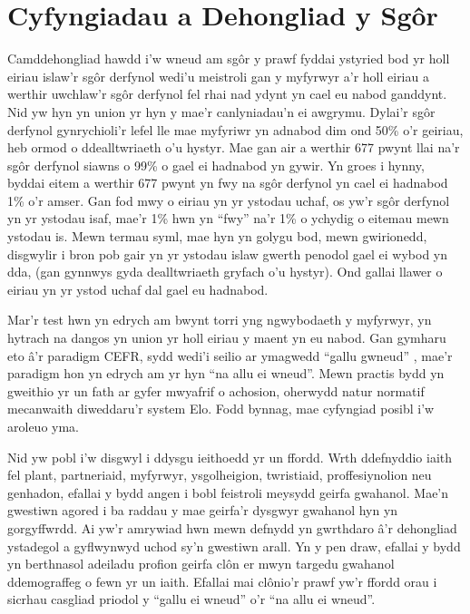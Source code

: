 \section{Cyfyngiadau a Dehongliad y Sgôr}
Camddehongliad hawdd i'w wneud am sgôr y prawf fyddai ystyried bod yr holl eiriau islaw'r sgôr derfynol wedi'u meistroli gan y myfyrwyr a'r holl eiriau a werthir uwchlaw'r sgôr derfynol fel rhai nad ydynt yn cael eu nabod ganddynt. Nid yw hyn yn union yr hyn y mae'r canlyniadau'n ei awgrymu. Dylai'r sgôr derfynol gynrychioli'r lefel lle mae myfyriwr yn adnabod dim ond 50\% o'r geiriau, heb ormod o ddealltwriaeth o'u hystyr. Mae gan air a werthir 677 pwynt llai na'r sgôr derfynol siawns o 99\% o gael ei hadnabod yn gywir. Yn groes i hynny, byddai eitem a werthir 677 pwynt yn fwy na sgôr derfynol yn cael ei hadnabod 1\% o'r amser. Gan fod mwy o eiriau yn yr ystodau uchaf, os yw'r sgôr derfynol yn yr ystodau isaf, mae'r 1\% hwn yn ``fwy'' na'r 1\% o ychydig o eitemau mewn ystodau is. Mewn termau syml, mae hyn yn golygu bod, mewn gwirionedd, disgwylir i bron pob gair yn yr ystodau islaw gwerth penodol gael ei wybod yn dda, (gan gynnwys gyda dealltwriaeth gryfach o'u hystyr). Ond gallai llawer o eiriau yn yr ystod uchaf dal gael eu hadnabod.

Mar'r test hwn yn edrych am bwynt torri yng ngwybodaeth y myfyrwyr, yn hytrach na dangos yn union yr holl eiriau y maent yn eu nabod. Gan gymharu eto â'r paradigm CEFR, sydd wedi'i seilio ar ymagwedd ``gallu gwneud'' \parencite{europe_common_2020}, mae'r paradigm hon yn edrych am yr hyn ``na allu ei wneud''. Mewn practis bydd yn gweithio yr un fath ar gyfer mwyafrif o achosion, oherwydd natur normatif mecanwaith diweddaru'r system Elo. Fodd bynnag, mae cyfyngiad posibl i'w aroleuo yma.

Nid yw pobl i'w disgwyl i ddysgu ieithoedd yr un ffordd. Wrth ddefnyddio iaith fel plant, partneriaid, myfyrwyr, ysgolheigion, twristiaid, proffesiynolion neu genhadon, efallai y bydd angen i bobl feistroli meysydd geirfa gwahanol. Mae'n gwestiwn agored i ba raddau y mae geirfa'r dysgwyr gwahanol hyn yn gorgyffwrdd. Ai yw'r amrywiad hwn mewn defnydd yn gwrthdaro â'r dehongliad ystadegol a gyflwynwyd uchod sy'n gwestiwn arall. Yn y pen draw, efallai y bydd yn berthnasol adeiladu profion geirfa clôn er mwyn targedu gwahanol ddemograffeg o fewn yr un iaith. Efallai mai clônio'r prawf yw'r ffordd orau i sicrhau casgliad priodol y ``gallu ei wneud'' o'r ``na allu ei wneud''.


